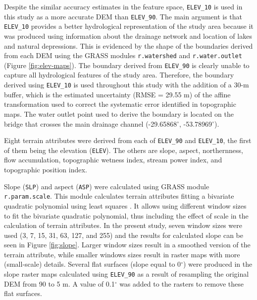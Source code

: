 Despite the similar accuracy estimates in the feature space, \texttt{ELEV\_10} is used in this study as a more accurate DEM than \texttt{ELEV\_90}. The main argument is that \texttt{ELEV\_10} provides a better hydrological representation of the study area because it was produced using information about the drainage network and location of lakes and natural depressions. This is evidenced by the shape of the boundaries derived from each DEM using the GRASS modules \texttt{r.watershed} and \texttt{r.water.outlet} (Figure \ref{fig:elev-maps}). The boundary derived from \texttt{ELEV\_90} is clearly unable to capture all hydrological features of the study area. Therefore, the boundary derived using \texttt{ELEV\_10} is used throughout this study with the addition of a 30-m buffer, which is the estimated uncertainty (RMSE = 29.55 m) of the affine transformation used to correct the systematic error identified in topographic maps. The water outlet point used to derive the boundary is located on the bridge that crosses the main drainage channel (-29.65868$^\circ$, -53.78969$^\circ$).


Eight terrain attributes were derived from each of \texttt{ELEV\_90} and \texttt{ELEV\_10}, the first of them being the elevation (\texttt{ELEV}). The others are slope, aspect, northernness, flow accumulation, topographic wetness index, stream power index, and topographic position index.

Slope (\texttt{SLP}) and aspect (\texttt{ASP}) were calculated using GRASS module \texttt{r.param.scale}. This module calculates terrain attributes fitting a bivariate quadratic polynomial using least squares \citep{Wood1996}. It allows using different window sizes to fit the bivariate quadratic polynomial, thus including the effect of scale in the calculation of terrain attributes. In the present study, seven window sizes were used (3, 7, 15, 31, 63, 127, and 255) and the results for calculated slope can be seen in Figure \ref{fig:slope}. Larger window sizes result in a smoothed version of the terrain attribute, while smaller windows sizes result in raster maps with more (small-scale) details. Several flat surfaces (slope equal to 0$^\circ$) were produced in the slope raster maps calculated using \texttt{ELEV\_90} as a result of resampling the original DEM from 90 to 5 m. A value of 0.1$^\circ$ was added to the rasters to remove these flat surfaces.


